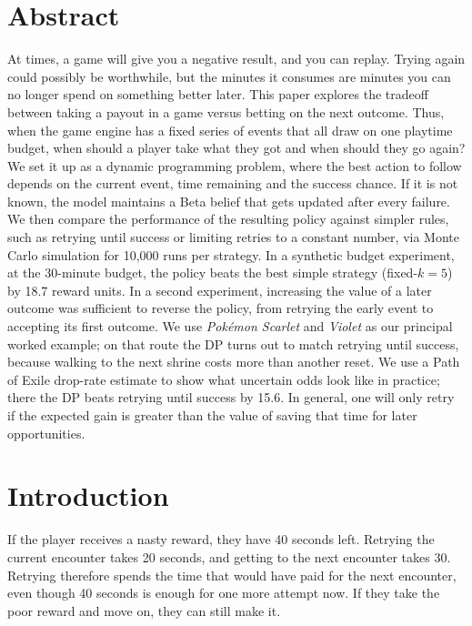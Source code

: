 \documentclass[11pt,a4paper]{article}
\newcommand{\who}[1]{}
\begin{document}
\section{Abstract\who{Vivian}}
At times, a game will give you a negative result, and you can replay. Trying again could possibly be worthwhile, but the minutes it consumes are minutes you can no longer spend on something better later. This paper explores the tradeoff between taking a payout in a game versus betting on the next outcome. Thus, when the game engine has a fixed series of events that all draw on one playtime budget, when should a player take what they got and when should they go again? We set it up as a dynamic programming problem, where the best action to follow depends on the current event, time remaining and the success chance. If it is not known, the model maintains a Beta belief that gets updated after every failure. We then compare the performance of the resulting policy against simpler rules, such as retrying until success or limiting retries to a constant number, via Monte Carlo simulation for 10,000 runs per strategy. In a synthetic budget experiment, at the 30-minute budget, the policy beats the best simple strategy (fixed-$k = 5$) by 18.7 reward units. In a second experiment, increasing the value of a later outcome was sufficient to reverse the policy, from retrying the early event to accepting its first outcome. We use \emph{Pok\'emon Scarlet} and \emph{Violet} as our principal worked example; on that route the DP turns out to match retrying until success, because walking to the next shrine costs more than another reset. We use a Path of Exile drop-rate estimate to show what uncertain odds look like in practice; there the DP beats retrying until success by 15.6. In general, one will only retry if the expected gain is greater than the value of saving that time for later opportunities.

\section{Introduction\who{Vivian}}
If the player receives a nasty reward, they have 40 seconds left. Retrying the current encounter takes 20 seconds, and getting to the next encounter takes 30. Retrying therefore spends the time that would have paid for the next encounter, even though 40 seconds is enough for one more attempt now. If they take the poor reward and move on, they can still make it.
\end{document}
